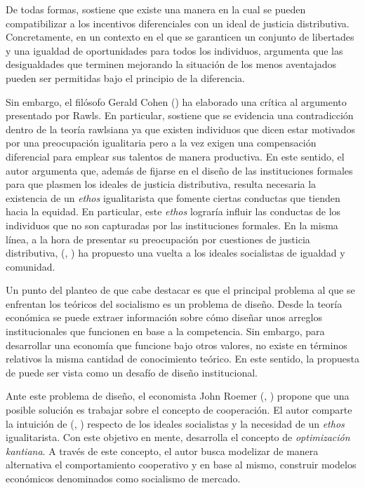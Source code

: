 De todas formas, \citet{Rawls_1971} sostiene que existe una manera en la cual se pueden compatibilizar a los incentivos diferenciales con un ideal de justicia distributiva. Concretamente, en un contexto en el que se garanticen un conjunto de libertades y una igualdad de oportunidades para todos los individuos, \citet{Rawls_1971} argumenta que las desigualdades que terminen mejorando la situación de los menos aventajados pueden ser permitidas bajo el principio de la diferencia.

Sin embargo, el filósofo Gerald Cohen (\citeyear{Cohen_2001}) ha elaborado una crítica al argumento presentado por Rawls. En particular, \citet{Cohen_2001} sostiene que se evidencia una contradicción dentro de la teoría rawlsiana ya que existen individuos que dicen estar motivados por una preocupación igualitaria pero a la vez exigen una compensación diferencial para emplear sus talentos de manera productiva. En este sentido, el autor argumenta que, además de fijarse en el diseño de las instituciones formales para que plasmen los ideales de justicia distributiva, resulta necesaria la existencia de un \textit{ethos} igualitarista que fomente ciertas conductas que tienden hacia la equidad. En particular, este \textit{ethos} lograría influir las conductas de los individuos que no son capturadas por las instituciones formales. En la misma línea, a la hora de presentar su preocupación por cuestiones de justicia distributiva, \citeauthor{Cohen_2014b} (\citeyear{Cohen_2014b}, \citeyear{Cohen_2014c}) ha propuesto una vuelta a los ideales socialistas de igualdad y comunidad. 

Un punto del planteo de \citet{Cohen_2014c} que cabe destacar es que el principal problema al que se enfrentan los teóricos del socialismo es un problema de diseño. Desde la teoría económica se puede extraer información sobre cómo diseñar unos arreglos institucionales que funcionen en base a la competencia. Sin embargo, para desarrollar una economía que funcione bajo otros valores, no existe en términos relativos la misma cantidad de conocimiento teórico. En este sentido, la propuesta de \citet{Cohen_2014c} puede ser vista como un desafío de diseño institucional. 

Ante este problema de diseño, el economista John Roemer (\citeyear{Roemer_2019}, \citeyear{Roemer_2021a}) propone que una posible solución es trabajar sobre el concepto de cooperación. El autor comparte la intuición de \citeauthor{Cohen_2001} (\citeyear{Cohen_2001}, \citeyear{Cohen_2014c}) respecto de los ideales socialistas y la necesidad de un \textit{ethos} igualitarista. Con este objetivo en mente, \citet{Roemer_2019} desarrolla el concepto de \textit{optimización kantiana}. A través de este concepto, el autor busca modelizar de manera alternativa el comportamiento cooperativo y en base al mismo, construir modelos económicos denominados como socialismo de mercado.

